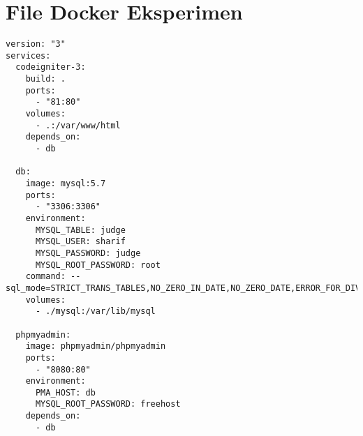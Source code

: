 \chapter{File Docker Eksperimen}
\label{lamp:C}

%
%
%


\begin{lstlisting}[language=docker-compose,caption=File \textit{docker-compose} yang digunakan untuk Experiment, label=kode:5:3:1:dockercompose]
version: "3"
services:
  codeigniter-3:
    build: .
    ports:
      - "81:80"
    volumes:
      - .:/var/www/html
    depends_on:
      - db

  db:
    image: mysql:5.7
    ports:
      - "3306:3306"
    environment:
      MYSQL_TABLE: judge
      MYSQL_USER: sharif
      MYSQL_PASSWORD: judge
      MYSQL_ROOT_PASSWORD: root
    command: --sql_mode=STRICT_TRANS_TABLES,NO_ZERO_IN_DATE,NO_ZERO_DATE,ERROR_FOR_DIVISION_BY_ZERO,NO_ENGINE_SUBSTITUTION
    volumes:
      - ./mysql:/var/lib/mysql

  phpmyadmin:
    image: phpmyadmin/phpmyadmin
    ports:
      - "8080:80"
    environment:
      PMA_HOST: db
      MYSQL_ROOT_PASSWORD: freehost
    depends_on:
      - db
\end{lstlisting}

